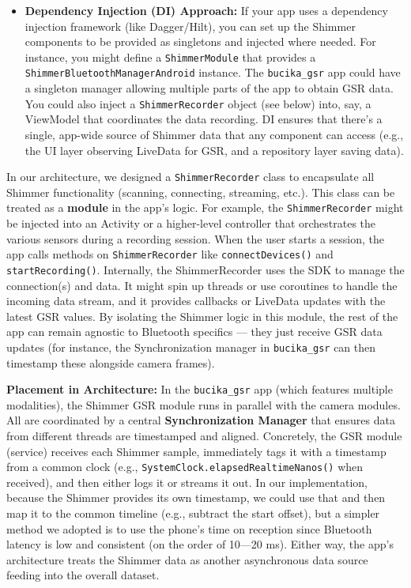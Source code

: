 {{\begin{itemize}
\item \textbf{Dependency Injection (DI) Approach:} If your app uses a dependency
  injection framework (like Dagger/Hilt), you can set up the Shimmer
  components to be provided as singletons and injected where needed. For
  instance, you might define a \texttt{ShimmerModule} that provides a
  \texttt{ShimmerBluetoothManagerAndroid} instance. The \texttt{bucika_gsr} app could
  have a singleton manager allowing multiple parts of the app to obtain
  GSR data. You could also inject a \texttt{ShimmerRecorder} object (see below)
  into, say, a ViewModel that coordinates the data recording. DI ensures
  that there's a single, app-wide source of Shimmer data that any
  component can access (e.g., the UI layer observing LiveData for GSR,
  and a repository layer saving data).

\end{itemize}
In our architecture, we designed a \texttt{ShimmerRecorder} class to
encapsulate all Shimmer functionality (scanning, connecting, streaming,
etc.)\cite{GSRPPGMachineLearning2024}\cite{GSRPPGMachineLearning2024}.
This class can be treated as a \textbf{module} in the app's logic. For
example, the \texttt{ShimmerRecorder} might be injected into an Activity or a
higher-level controller that orchestrates the various sensors during a
recording session. When the user starts a session, the app calls methods
on \texttt{ShimmerRecorder} like \texttt{connectDevices()} and
\texttt{startRecording()}\cite{GSRPPGMachineLearning2024}\cite{TopdonTC001}.
Internally, the ShimmerRecorder uses the SDK to manage the connection(s)
and data. It might spin up threads or use coroutines to handle the
incoming data stream, and it provides callbacks or LiveData updates with
the latest GSR values. By isolating the Shimmer logic in this module,
the rest of the app can remain agnostic to Bluetooth specifics --- they
just receive GSR data updates (for instance, the Synchronization manager
in \texttt{bucika_gsr} can then timestamp these alongside camera frames).

\textbf{Placement in Architecture:} In the \texttt{bucika_gsr} app (which features
multiple modalities), the Shimmer GSR module runs in parallel with the
camera modules. All are coordinated by a central \textbf{Synchronization
Manager} that ensures data from different threads are timestamped and
aligned\cite{CortisolStressIndicator2020}.
Concretely, the GSR module (service) receives each Shimmer sample,
immediately tags it with a timestamp from a common clock (e.g.,
\texttt{SystemClock.elapsedRealtimeNanos()} when
received)\cite{CortisolStressIndicator2020}\cite{DeviceServer},
and then either logs it or streams it out. In our implementation,
because the Shimmer provides its own timestamp, we could use that and
then map it to the common timeline (e.g., subtract the start offset),
but a simpler method we adopted is to use the phone's time on reception
since Bluetooth latency is low and consistent (on the order of 10---20
ms)\cite{DeviceServer}.
Either way, the app's architecture treats the Shimmer data as another
asynchronous data source feeding into the overall dataset.

}}
